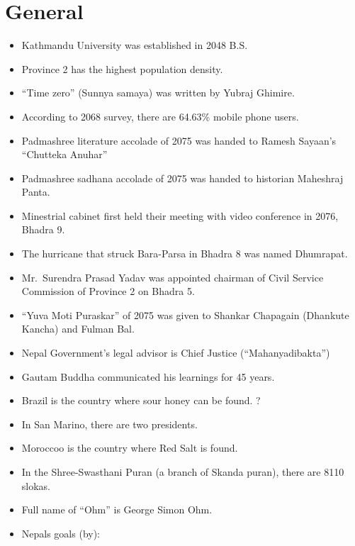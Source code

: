 \documentclass[
]{book}
\begin{document}
\hypertarget{general}{%
\section{General}\label{general}}

\begin{itemize}
\item
  Kathmandu University was established in 2048 B.S.
\item
  Province 2 has the highest population density.
\item
  ``Time zero'' (Sunnya samaya) was written by Yubraj Ghimire.
\item
  According to 2068 survey, there are 64.63\% mobile phone users.
\item
  Padmashree literature accolade of 2075 was handed to Ramesh Sayaan's ``Chutteka Anuhar''
\item
  Padmashree sadhana accolade of 2075 was handed to historian Maheshraj Panta.
\item
  Minestrial cabinet first held their meeting with video conference in 2076, Bhadra 9.
\item
  The hurricane that struck Bara-Parsa in Bhadra 8 was named Dhumrapat.
\item
  Mr.~Surendra Prasad Yadav was appointed chairman of Civil Service Commission of Province 2 on Bhadra 5.
\item
  ``Yuva Moti Puraskar'' of 2075 was given to Shankar Chapagain (Dhankute Kancha) and Fulman Bal.
\item
  Nepal Government's legal advisor is Chief Justice (``Mahanyadibakta'')
\item
  Gautam Buddha communicated his learnings for 45 years.
\item
  Brazil is the country where sour honey can be found. ?
\item
  In San Marino, there are two presidents.
\item
  Moroccoo is the country where Red Salt is found.
\item
  In the Shree-Swasthani Puran (a branch of Skanda puran), there are 8110 slokas.
\item
  Full name of ``Ohm'' is George Simon Ohm.
\item
  Nepals goals (by):


\end{itemize}
\end{document}
